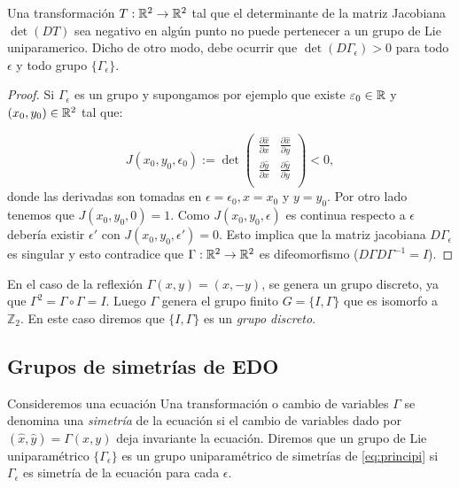  \begin{teorema}{}
   Una transformación  $T:\mathbb{R}^2\to\mathbb{R}^2$ tal que el determinante de la matriz Jacobiana $\det(DT)$ sea negativo en algún punto no puede pertenecer a un grupo de Lie uniparamerico. Dicho de otro modo, debe ocurrir que $\det(D\Gamma_{\epsilon})>0$ para todo $\epsilon$ y todo grupo $\{\Gamma_{\epsilon}\}$.
 \end{teorema}
\begin{proof}
 Si $\Gamma_{\epsilon}$ es un grupo y supongamos por ejemplo que existe $\varepsilon_0\in\mathbb{R}$ y $(x_0,y_0)\in\mathbb{R}^2$ tal que:

\[J(x_0,y_0,\epsilon_0):=\det\begin{pmatrix} \frac{\partial\hat{x}}{\partial x}&  \frac{\partial\hat{x}}{\partial y}\\
 \frac{\partial\hat{y}}{\partial x} &  \frac{\partial\hat{y}}{\partial y}\\
\end{pmatrix}<0,
\]
donde las derivadas son tomadas en $\epsilon=\epsilon_0, x=x_0$ y $y=y_0$.
 Por otro lado tenemos que $J(x_0,y_0,0)=1$. Como $J(x_0,y_0,\epsilon)$ es continua respecto a $\epsilon$ debería existir $\epsilon'$ con $J(x_0,y_0,\epsilon')=0$. Esto implica que la matriz jacobiana $D\Gamma_{\epsilon}$ es singular y esto contradice que $\Gamma:\mathbb{R}^2\to \mathbb{R}^2$ es difeomorfismo ($D\Gamma D\Gamma^{-1}=I$).
\end{proof}


 
 
 



 En el caso de la reflexión $\Gamma(x,y)=(x,-y)$, se  genera un grupo discreto, ya que $\Gamma^2=\Gamma\circ \Gamma=I$. Luego $\Gamma$ genera el grupo finito $G=\{I,\Gamma\}$ que es isomorfo a $\mathbb{Z}_2$. En este caso diremos que    $\{I,\Gamma\}$ es un \emph{grupo discreto}.





\subsection{Grupos de simetrías de EDO}
\begin{definicion}
 Consideremos una ecuación
Una transformación o cambio de variables $\Gamma$ se denomina una \emph{simetría} de la ecuación si el cambio de variables dado por $(\hat{x},\hat{y})=\Gamma(x,y)$ deja invariante  la ecuación.  Diremos que un grupo de Lie uniparamétrico $\{\Gamma_{\epsilon}\}$ es un grupo uniparamétrico de simetrías de \eqref{eq:principi} si $\Gamma_{\epsilon}$ es simetría de la ecuación para cada $\epsilon$.

\end{definicion}


